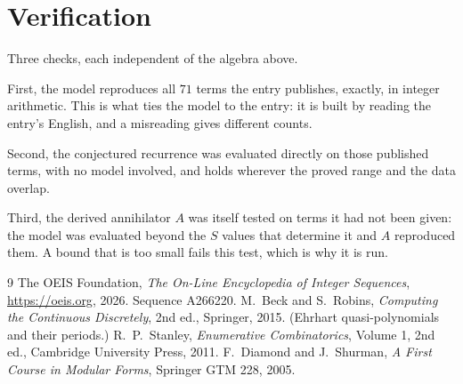 \documentclass[11pt,a4paper]{article}
\theoremstyle{plain}
\theoremstyle{definition}
\begin{document}
\section{Verification}

Three checks, each independent of the algebra above.

First, the model reproduces all $71$ terms the entry publishes, exactly, in integer
arithmetic. This is what ties the model to the entry: it is built by reading the entry's
English, and a misreading gives different counts.

Second, the conjectured recurrence was evaluated directly on those published terms, with no
model involved, and holds wherever the proved range and the data overlap.

Third, the derived annihilator $A$ was itself tested on terms it had not been given: the model
was evaluated beyond the $S$ values that determine it and $A$ reproduced them. A bound that is
too small fails this test, which is why it is run.

\begin{thebibliography}{9}
 The OEIS Foundation, \emph{The On-Line Encyclopedia of Integer
Sequences}, \url{https://oeis.org}, 2026. Sequence A266220.
 M.~Beck and S.~Robins, \emph{Computing the Continuous Discretely},
2nd ed., Springer, 2015. (Ehrhart quasi-polynomials and their periods.)
 R.~P.~Stanley, \emph{Enumerative Combinatorics}, Volume 1, 2nd ed.,
Cambridge University Press, 2011.
 F.~Diamond and J.~Shurman, \emph{A First Course in Modular Forms},
Springer GTM 228, 2005.
\end{thebibliography}
\end{document}
